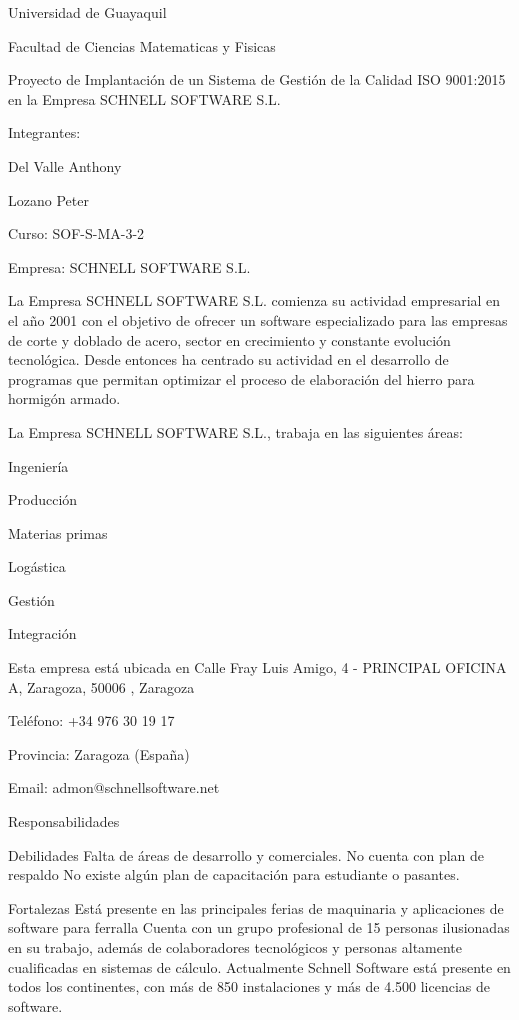 \documentclass[10pt,a4paper]{article}
\begin{document}
\begin{center}
Universidad de Guayaquil

Facultad de Ciencias Matematicas y Fisicas

Proyecto de Implantación de un Sistema de Gestión de la Calidad ISO 9001:2015 en la Empresa SCHNELL SOFTWARE S.L.

Integrantes:

Del Valle Anthony

Lozano Peter

Curso: SOF-S-MA-3-2
\end{center}

Empresa: SCHNELL SOFTWARE S.L.

La Empresa SCHNELL SOFTWARE S.L. comienza su actividad empresarial en el año 2001 con el objetivo de ofrecer un software especializado para las empresas de corte y doblado de acero, sector en crecimiento y constante evolución tecnológica. Desde entonces ha centrado su actividad en el desarrollo de programas que permitan optimizar el proceso de elaboración del hierro para hormigón armado.

La Empresa SCHNELL SOFTWARE S.L., trabaja en las siguientes áreas:

Ingeniería

Producción

Materias primas

Logástica

Gestión

Integración

Esta empresa está ubicada en Calle Fray Luis Amigo, 4 - PRINCIPAL OFICINA A, Zaragoza, 50006 , Zaragoza

Teléfono: +34 976 30 19 17

Provincia: Zaragoza (España)

Email: admon@schnellsoftware.net

Responsabilidades


Debilidades
Falta de áreas de desarrollo y comerciales.
No cuenta con plan de respaldo
No existe algún plan de capacitación para estudiante o pasantes.

Fortalezas
Está presente en las principales ferias de maquinaria y aplicaciones de software para ferralla
Cuenta con un grupo profesional de 15 personas ilusionadas en su trabajo, además de colaboradores tecnológicos y personas altamente cualificadas en sistemas de cálculo.
Actualmente Schnell Software está presente en todos los continentes, con más de 850 instalaciones y más de 4.500 licencias de software.
\end{document}
